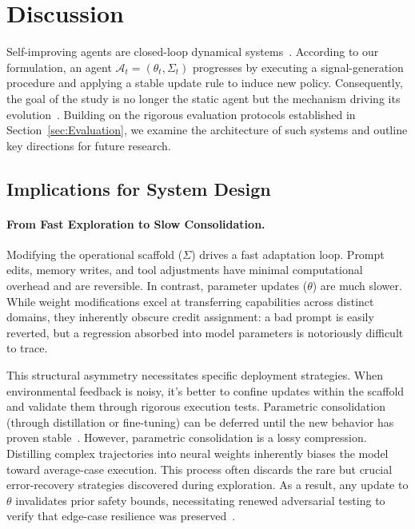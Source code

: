 \documentclass{article}
\begin{document}
\section{Discussion}
\label{sec:Discussion}
Self-improving agents are closed-loop dynamical systems~\citep{xie2024osworldbenchmarkingmultimodalagents}. According to our formulation, an agent $\mathcal{A}_t=(\theta_t, \Sigma_t)$ progresses by executing a signal-generation procedure and applying a stable update rule to induce new policy. Consequently, the goal of the study is no longer the static agent but the mechanism driving its evolution~\citep{yampolskiy2015seed, robeyns2025selfimprovingcodingagent, pan2025trainingsoftwareengineeringagents}. Building on the rigorous evaluation protocols established in Section~\ref{sec:Evaluation}, we examine the architecture of such systems and outline key directions for future research.


\subsection{Implications for System Design}
\label{sec:Discussion_Implications}
\paragraph{From Fast Exploration to Slow Consolidation.}
Modifying the operational scaffold ($\Sigma$) drives a fast adaptation loop. Prompt edits, memory writes, and tool adjustments have minimal computational overhead and are reversible. In contrast, parameter updates ($\theta$) are much slower. While weight modifications excel at transferring capabilities across distinct domains, they inherently obscure credit assignment: a bad prompt is easily reverted, but a regression absorbed into model parameters is notoriously difficult to trace.


This structural asymmetry necessitates specific deployment strategies. When environmental feedback is noisy, it's better to confine updates within the scaffold and validate them through rigorous execution tests.  Parametric consolidation (through distillation or fine-tuning) can be deferred until the new behavior has proven stable~\citep{qiu2025agentdistilltrainingfreeagentdistillation, lyu2025correctionmasteryreinforceddistillation}. However, parametric consolidation is a lossy compression. Distilling complex trajectories into neural weights inherently biases the model toward average-case execution. This process often discards the rare but crucial error-recovery strategies discovered during exploration. As a result, any update to $\theta$ invalidates prior safety bounds, necessitating renewed adversarial testing to verify that edge-case resilience was preserved~\citep{dou2025rerestreflectionreinforcedselftraininglanguage, wu2024avataroptimizingllmagents}.
\end{document}
